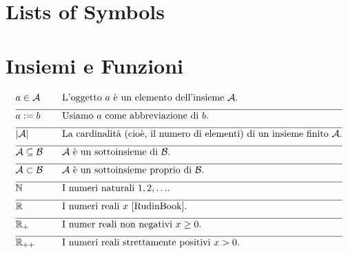 
\section*{Lists of Symbols}

\vspace*{-2mm}
\section*{Insiemi e Funzioni} 

\begin{align} 
	&a \in \mathcal{A} & \quad & \parbox{.75\textwidth}{L'oggetto $a$  è un elemento dell'insieme $\mathcal{A}$.} \nonumber \\[2mm] \hline \nonumber\\[-5mm]
	&a \defeq b & \quad & \mbox{Usiamo $a$ come abbreviazione di  $b$. }\nonumber \\[2mm] \hline \nonumber\\[-5mm]
	&|\mathcal{A}| & \quad & \mbox{La cardinalità (cioè, il numero di elementi) di un insieme finito $\mathcal{A}$.}\nonumber \\[2mm] \hline \nonumber\\[-5mm]
	&\mathcal{A} \subseteq \mathcal{B}& \quad & \mbox{$\mathcal{A}$ è un sottoinsieme di $\mathcal{B}$.}\nonumber \\[2mm] \hline \nonumber\\[-5mm]
	&\mathcal{A} \subset \mathcal{B}& \quad & \mbox{$\mathcal{A}$ è un sottoinsieme proprio di $\mathcal{B}$.} \nonumber \\[2mm] \hline \nonumber\\[-5mm]
	&\mathbb{N} & \quad & \mbox{I numeri naturali $1,2,\ldots$.}\nonumber \\[2mm] \hline \nonumber\\[-5mm]
	&\mathbb{R}  &\quad &\mbox{I numeri reali $x$ \cite{RudinBook}.} \nonumber \\[2mm] \hline \nonumber\\[-5mm]
	&\mathbb{R}_{+}  &\quad &\mbox{I numer reali non negativi $x\geq0$.}\nonumber \\[2mm] \hline \nonumber\\[-5mm]
	&\mathbb{R}_{++}  &\quad &\mbox{I numeri reali strettamente positivi $x> 0$.} \nonumber
\end{align} 

